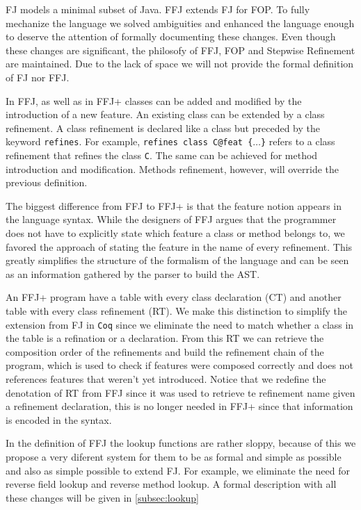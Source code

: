 \ac{FJ} models a minimal subset of Java. \ac{FFJ} extends \ac{FJ} for \ac{FOP}.
To fully mechanize the language we solved ambiguities and enhanced the language enough
to deserve the attention of formally documenting these changes. 
Even though these changes are significant, the philosofy of \ac{FFJ}, \ac{FOP} and Stepwise Refinement are maintained.
Due to the lack of space we will not provide the formal definition of \ac{FJ} nor \ac{FFJ}.

In \ac{FFJ}, as well as in \ac{FFJ+} classes can be added and modified by the introduction of a new feature.
An existing class can be extended by a class refinement. A class refinement is declared like a class but
preceded by the keyword \texttt{refines}. For example, \texttt{refines class C@feat \{$\dots$\}} refers to a class refinement that
refines the class \texttt{C}. The same can be achieved for method introduction and modification. Methods refinement,
however, will override the previous definition.

The biggest difference from \ac{FFJ} to \ac{FFJ+} is that the feature notion appears in the language syntax.
While the designers of \ac{FFJ} argues that the programmer does not have to explicitly state which
feature a class or method belongs to, we favored the approach of stating the feature in the name of every refinement.
This greatly simplifies the structure of the formalism of the language and can be seen as an information gathered
by the parser to build the AST.

An \ac{FFJ+} program have a table with every class declaration (\textsf{CT}) and another table with every class refinement (\textsf{RT}).
We make this distinction to simplify the extension from \ac{FJ} in \texttt{Coq} since we eliminate the need
to match whether a class in the table is a refination or a declaration. From this \textsf{RT} we can retrieve the composition order
of the refinements and build the refinement chain of the program, which is used to check if features were composed correctly and
does not references features that weren't yet introduced. Notice that we redefine the denotation of \textsf{RT} from \ac{FFJ}
since it was used to retrieve te refinement name given a refinement declaration, this is no longer needed in \ac{FFJ+} since
that information is encoded in the syntax.

In the definition of \ac{FFJ} the lookup functions are rather sloppy, because of this we propose a very diferent system
for them to be as formal and simple as possible and also as simple possible to extend \ac{FJ}. 
For example, we eliminate the need for reverse field lookup and 
reverse method lookup. A formal description with all these changes will be given in \ref{subsec:lookup}


